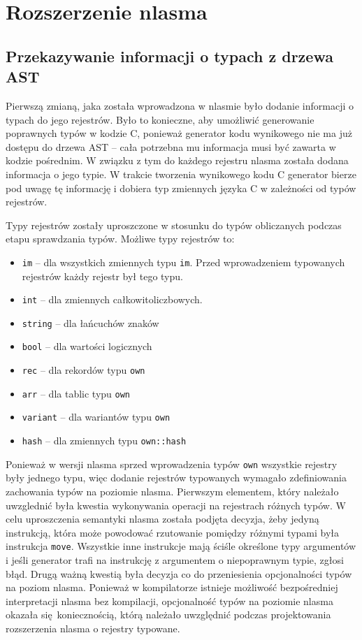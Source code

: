 \documentclass[licencjacka]{pracamgr}
\begin{document}
\chapter{Rozszerzenie nlasma}
\section{Przekazywanie informacji o typach z drzewa AST}
Pierwszą zmianą, jaka została wprowadzona w nlasmie było dodanie informacji o typach do jego rejestrów.
Było to konieczne, aby umożliwić generowanie poprawnych typów w kodzie C, ponieważ generator kodu wynikowego
nie ma już dostępu do drzewa AST -- cała potrzebna mu informacja musi być zawarta w kodzie pośrednim.
W związku z tym do każdego rejestru nlasma została dodana informacja o jego typie.
W trakcie tworzenia wynikowego kodu C generator bierze pod uwagę tę informację i dobiera typ zmiennych języka C
w zależności od typów rejestrów.

Typy rejestrów zostały uproszczone w stosunku do typów obliczanych podczas etapu sprawdzania typów.
Możliwe typy rejestrów to:
\begin{itemize}
 \item \texttt{im} -- dla wszystkich zmiennych typu \texttt{im}. Przed wprowadzeniem typowanych rejestrów
 każdy rejestr był tego typu.
 \item \texttt{int} -- dla zmiennych całkowitoliczbowych.
 \item \texttt{string} -- dla łańcuchów znaków
 \item \texttt{bool} -- dla wartości logicznych
 \item \texttt{rec} -- dla rekordów typu \texttt{own}
 \item \texttt{arr} -- dla tablic typu \texttt{own}
 \item \texttt{variant} -- dla wariantów typu \texttt{own}
 \item \texttt{hash} -- dla zmiennych typu \texttt{own::hash}
\end{itemize}


Ponieważ w wersji nlasma sprzed wprowadzenia typów \texttt{own} wszystkie rejestry były jednego typu, więc
dodanie rejestrów typowanych wymagało zdefiniowania zachowania typów na poziomie nlasma.
Pierwszym elementem, który należało uwzglednić była kwestia wykonywania operacji na rejestrach różnych typów.
W celu uproszczenia semantyki nlasma została podjęta decyzja, żeby jedyną instrukcją, która może powodować
rzutowanie pomiędzy różnymi typami była instrukcja \texttt{move}.
Wszystkie inne instrukcje mają ściśle określone typy argumentów i jeśli generator trafi na instrukcję z argumentem
o niepoprawnym typie, zgłosi błąd. Drugą ważną kwestią była decyzja co do przeniesienia opcjonalności typów
na poziom nlasma. Ponieważ w kompilatorze istnieje możliwość bezpośredniej interpretacji nlasma bez kompilacji,
opcjonalność typów na poziomie nlasma okazała się koniecznością, którą należało uwzględnić podczas projektowania
rozszerzenia nlasma o rejestry typowane.
\end{document}
